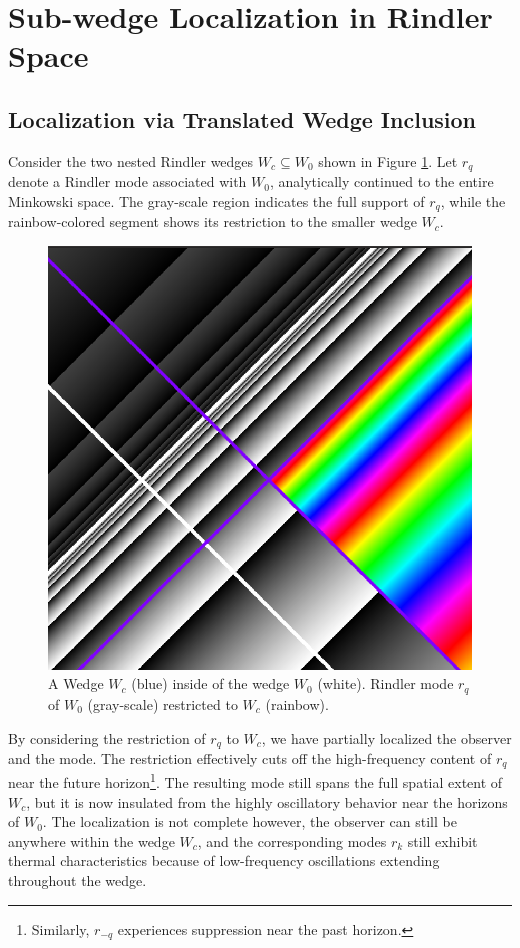 \documentclass[12pt,a4paper]{article}
\begin{document}
\section{Sub-wedge Localization in Rindler Space}
\subsection{Localization via Translated Wedge Inclusion}

Consider the two nested Rindler wedges $W_c \subseteq W_0$ shown in Figure \ref{restrict}. Let $r_q$ denote a Rindler mode associated with $W_0$, analytically continued to the entire Minkowski space. The gray-scale region indicates the full support of $r_q$, while the rainbow-colored segment shows its restriction to the smaller wedge $W_c$.

\begin{figure}[h]
  \centering
\includegraphics[scale=0.4]{wedge_in_wedge.png}
\caption{A Wedge $W_c$ (blue) inside of the wedge $W_0$ (white). Rindler mode $r_q$ of $W_0$ (gray-scale) restricted to $W_c$ (rainbow).}
\label{restrict}
\end{figure}

By considering the restriction of $r_q$ to $W_c$, we have partially localized the observer and the mode. The restriction effectively cuts off the high-frequency content of $r_q$ near the future horizon\footnote{Similarly, $r_{-q}$ experiences suppression near the past horizon.}. The resulting mode still spans the full spatial extent of $W_c$, but it is now insulated from the highly oscillatory behavior near the horizons of $W_0$.  The localization is not complete however, the observer can still be anywhere within the wedge $W_c$, and the corresponding modes $r_k$ still exhibit thermal characteristics because of low-frequency oscillations extending throughout the wedge.
\end{document}

